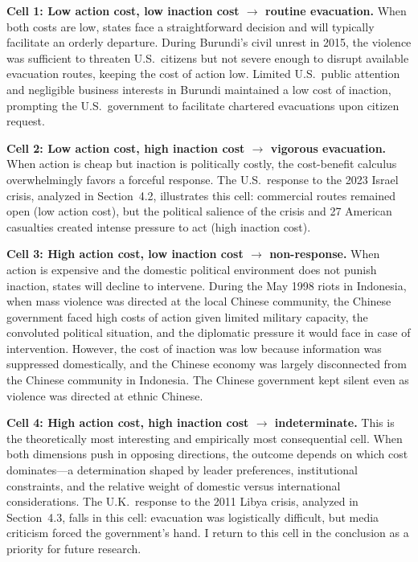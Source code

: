\documentclass[12pt]{article}
\begin{document}
\textbf{Cell 1: Low action cost, low inaction cost $\rightarrow$ routine evacuation.} When both costs are low, states face a straightforward decision and will typically facilitate an orderly departure. During Burundi's civil unrest in 2015, the violence was sufficient to threaten U.S.\ citizens but not severe enough to disrupt available evacuation routes, keeping the cost of action low. Limited U.S.\ public attention and negligible business interests in Burundi maintained a low cost of inaction, prompting the U.S.\ government to facilitate chartered evacuations upon citizen request.

\textbf{Cell 2: Low action cost, high inaction cost $\rightarrow$ vigorous evacuation.} When action is cheap but inaction is politically costly, the cost-benefit calculus overwhelmingly favors a forceful response. The U.S.\ response to the 2023 Israel crisis, analyzed in Section~4.2, illustrates this cell: commercial routes remained open (low action cost), but the political salience of the crisis and 27 American casualties created intense pressure to act (high inaction cost).

\textbf{Cell 3: High action cost, low inaction cost $\rightarrow$ non-response.} When action is expensive and the domestic political environment does not punish inaction, states will decline to intervene. During the May 1998 riots in Indonesia, when mass violence was directed at the local Chinese community, the Chinese government faced high costs of action given limited military capacity, the convoluted political situation, and the diplomatic pressure it would face in case of intervention. However, the cost of inaction was low because information was suppressed domestically, and the Chinese economy was largely disconnected from the Chinese community in Indonesia. The Chinese government kept silent even as violence was directed at ethnic Chinese.

\textbf{Cell 4: High action cost, high inaction cost $\rightarrow$ indeterminate.} This is the theoretically most interesting and empirically most consequential cell. When both dimensions push in opposing directions, the outcome depends on which cost dominates---a determination shaped by leader preferences, institutional constraints, and the relative weight of domestic versus international considerations. The U.K.\ response to the 2011 Libya crisis, analyzed in Section~4.3, falls in this cell: evacuation was logistically difficult, but media criticism forced the government's hand. I return to this cell in the conclusion as a priority for future research.
\end{document}
